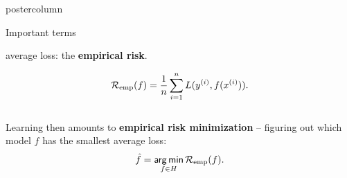 \documentclass{beamer}
\begin{document}
\begin{frame}[fragile]{}
\begin{columns}
\begin{column}{.31\textwidth}
\begin{beamercolorbox}[center]{postercolumn}
\begin{minipage}{.98\textwidth}
{\begin{myblock}{Important terms}
						\begin{codebox}
							average loss: the \textbf{empirical risk}.
						\end{codebox}
						$$\mathcal{R}_{\text{emp}}(f) = \frac{1}{n} \sum_{i=1}^n L(y^{(i)}, f(x^{(i)})).$$
						\\
						\hspace*{1ex}Learning then amounts to \textbf{empirical risk minimization} -- figuring out \hspace*{1ex}which model $f$ has the smallest average loss:$$\hat{f} = \mathop{\sf arg\,min}_{f \in H} \mathcal{R}_{\text{emp}}(f).$$
					\end{myblock}
				}
			\end{minipage}
		\end{beamercolorbox}
	\end{column}
\end{columns}
\end{frame}
\end{document}
